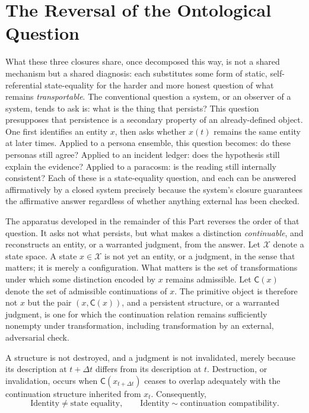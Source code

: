 \section{The Reversal of the Ontological Question}
\label{sec:reversal}

What these three closures share, once decomposed this way, is not a shared mechanism but a shared diagnosis: each substitutes some form of static, self-referential state-equality for the harder and more honest question of what remains \emph{transportable}. The conventional question a system, or an observer of a system, tends to ask is: what is the thing that persists? This question presupposes that persistence is a secondary property of an already-defined object. One first identifies an entity $x$, then asks whether $x(t)$ remains the same entity at later times. Applied to a persona ensemble, this question becomes: do these personas still agree? Applied to an incident ledger: does the hypothesis still explain the evidence? Applied to a paracosm: is the reading still internally consistent? Each of these is a state-equality question, and each can be answered affirmatively by a closed system precisely because the system's closure guarantees the affirmative answer regardless of whether anything external has been checked.

The apparatus developed in the remainder of this Part reverses the order of that question. It asks not what persists, but what makes a distinction \emph{continuable}, and reconstructs an entity, or a warranted judgment, from the answer. Let $\mathcal{X}$ denote a state space. A state $x \in \mathcal{X}$ is not yet an entity, or a judgment, in the sense that matters; it is merely a configuration. What matters is the set of transformations under which some distinction encoded by $x$ remains admissible. Let $\mathsf{C}(x)$ denote the set of admissible continuations of $x$. The primitive object is therefore not $x$ but the pair $(x, \mathsf{C}(x))$, and a persistent structure, or a warranted judgment, is one for which the continuation relation remains sufficiently nonempty under transformation, including transformation by an external, adversarial check.

\begin{proposition}
\label{prop:identity-not-state-equality}
A structure is not destroyed, and a judgment is not invalidated, merely because its description at $t+\Delta t$ differs from its description at $t$. Destruction, or invalidation, occurs when $\mathsf{C}(x_{t+\Delta t})$ ceases to overlap adequately with the continuation structure inherited from $x_t$. Consequently,
\[
\text{Identity} \neq \text{state equality}, \qquad \text{Identity} \sim \text{continuation compatibility}.
\]
\end{proposition}

